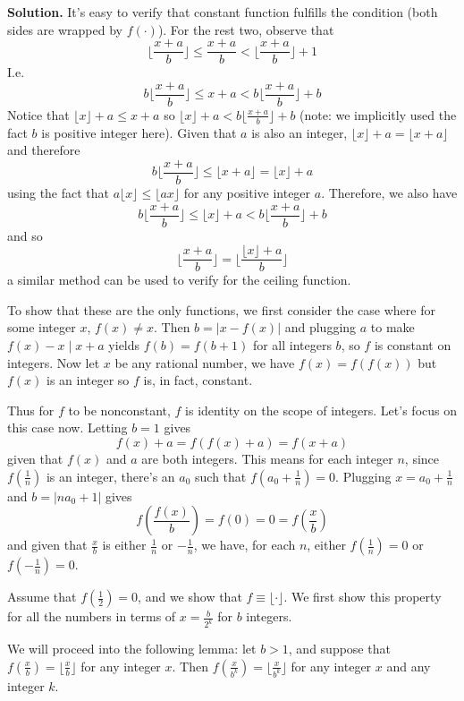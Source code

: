 \documentclass[11pt,a4paper]{article}
\begin{document}
\begin{enumerate}
		\textbf{Solution.} It's easy to verify that constant function fulfills the condition (both sides are wrapped by $f(\cdot)$). For the rest two, observe that 
		\[
		\lfloor \frac{x+a}{b}\rfloor\le \frac{x+a}{b} < \lfloor \frac{x+a}{b}\rfloor + 1
		\]
		I.e. 
		\[
		b\lfloor \frac{x+a}{b}\rfloor\le x+a < b\lfloor \frac{x+a}{b}\rfloor + b
		\]
		Notice that $\lfloor x\rfloor +a\le x+a$ so $\lfloor x\rfloor+a< b\lfloor \frac{x+a}{b}\rfloor + b$ (note: we implicitly used the fact $b$ is positive integer here). 
		Given that $a$ is also an integer, $\lfloor x\rfloor +a=\lfloor x+a\rfloor$ and therefore 
		\[
		b\lfloor \frac{x+a}{b}\rfloor\le \lfloor x+a\rfloor = \lfloor x\rfloor+a
		\]
		using the fact that $a\lfloor x\rfloor \le \lfloor ax \rfloor $ for any positive integer $a$. 
		Therefore, we also have 
		\[
		b\lfloor \frac{x+a}{b}\rfloor\le \lfloor x\rfloor +a < b\lfloor \frac{x+a}{b}\rfloor + b
		\]
		and so 
		\[
		\lfloor \frac{x+a}{b}\rfloor = \lfloor \frac{\lfloor x\rfloor +a}{b}\rfloor
		\]
		a similar method can be used to verify for the ceiling function. 
		
		To show that these are the only functions, we first consider the case where for some integer $x$, $f(x)\neq x$. Then $b=|x-f(x)|$ and plugging $a$ to make $f(x)-x\mid x+a$ yields $f(b)=f(b+1)$ for all integers $b$, so $f$ is constant on integers. Now let $x$ be any rational number, we have $f(x)=f(f(x))$ but $f(x)$ is an integer so $f$ is, in fact, constant. 
		
		Thus for $f$ to be nonconstant, $f$ is identity on the scope of integers. Let's focus on this case now. Letting $b=1$ gives 
		\[
		f(x)+a=f(f(x)+a)=f(x+a)
		\]
		given that $f(x)$ and $a$ are both integers. 
		This means for each integer $n$, since $f(\frac 1n)$ is an integer, there's an $a_0$ such that $f(a_0+\frac 1n)=0$. Plugging $x=a_0+\frac 1n$ and $b=|na_0+1|$ gives 
		\[
		f(\frac{f(x)}{b})=f(0)=0=f(\frac{x}{b})
		\]
		and given that $\frac{x}{b}$ is either $\frac 1n$ or $-\frac 1n$, we have, for each $n$, either $f(\frac 1n)=0$ or $f(-\frac 1n)=0$. 
		
		Assume that $f(\frac 12)=0$, and we show that $f\equiv \lfloor \cdot\rfloor$. 
		We first show this property for all the numbers in terms of $x=\frac{b}{2^k}$ for $b$ integers. 
		
		We will proceed into the following lemma: let $b>1$, and suppose that $f(\frac xb)=\lfloor\frac xb\rfloor$ for any integer $x$. Then $f(\frac x{b^k})=\lfloor\frac x{b^k}\rfloor$ for any integer $x$ and any integer $k$. 
		

\end{enumerate}
\end{document}
